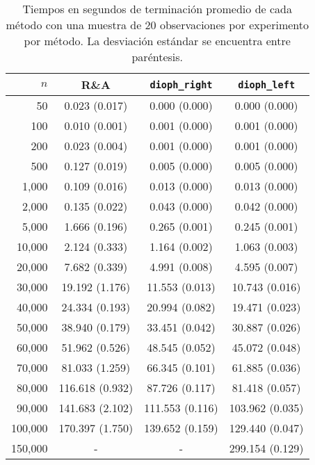 \begin{table}[h]
	\centering
	\begin{tabular}{rccc} \toprule
		$n$ & R\&A & \texttt{dioph\_right} & \texttt{dioph\_left} \\ \midrule
		50     & 0.023 (0.017) & 0.000 (0.000) & 0.000 (0.000)\\
		100    & 0.010 (0.001) & 0.001 (0.000) & 0.001 (0.000)\\
		200    & 0.023 (0.004) & 0.001 (0.000) & 0.001 (0.000)\\
		500    & 0.127 (0.019) & 0.005 (0.000) & 0.005 (0.000)\\ \midrule
		1,000   & 0.109 (0.016) & 0.013 (0.000) & 0.013 (0.000)\\
		2,000   & 0.135 (0.022) & 0.043 (0.000) & 0.042 (0.000)\\
		5,000   & 1.666 (0.196) & 0.265 (0.001) & 0.245 (0.001)\\
		10,000  & 2.124 (0.333) & 1.164 (0.002) & 1.063 (0.003)\\ \midrule
		20,000  & 7.682 (0.339) & 4.991 (0.008) & 4.595 (0.007)\\
		30,000  &  19.192 (1.176) & 11.553 (0.013) & 10.743 (0.016)\\
		40,000  &  24.334 (0.193) & 20.994 (0.082) & 19.471 (0.023)\\
		50,000  &  38.940 (0.179) & 33.451 (0.042) & 30.887 (0.026)\\ \midrule
		60,000  &  51.962 (0.526) & 48.545 (0.052) & 45.072 (0.048)\\
		70,000  &  81.033 (1.259) & 66.345 (0.101) & 61.885 (0.036)\\
		80,000  & 116.618 (0.932) & 87.726 (0.117) & 81.418 (0.057)\\
		90,000  & 141.683 (2.102) & 111.553 (0.116) & 103.962 (0.035)\\ \midrule
		100,000 & 170.397 (1.750) & 139.652 (0.159) & 129.440 (0.047)\\
		150,000 & - & - & 299.154 (0.129) \\ \bottomrule
	\end{tabular}
	\caption{Tiempos en segundos de terminación promedio de cada método con una muestra de 20
	observaciones por experimento por método. La desviación estándar se encuentra entre paréntesis.}
	\label{table:fin:mt:times}
\end{table}

